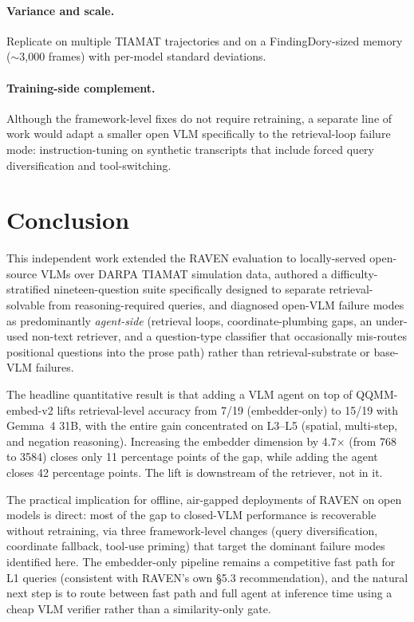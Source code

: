 \documentclass[12pt,letterpaper,oneside]{article}
\begin{document}
\paragraph{Variance and scale.}
Replicate on multiple TIAMAT trajectories and on a FindingDory-sized
memory ($\sim$3{,}000 frames) with per-model standard deviations.

\paragraph{Training-side complement.}
Although the framework-level fixes do not require retraining, a
separate line of work would adapt a smaller open VLM specifically to
the retrieval-loop failure mode: instruction-tuning on synthetic
transcripts that include forced query diversification and
tool-switching.

\section{Conclusion}\label{sec:conclusion}

This independent work extended the RAVEN evaluation to locally-served
open-source VLMs over DARPA TIAMAT simulation data, authored a
difficulty-stratified nineteen-question suite specifically designed
to separate retrieval-solvable from reasoning-required queries, and
diagnosed open-VLM failure modes as predominantly \emph{agent-side}
(retrieval loops, coordinate-plumbing gaps, an under-used non-text
retriever, and a question-type classifier that occasionally
mis-routes positional questions into the prose path) rather than
retrieval-substrate or base-VLM failures.

The headline quantitative result is that adding a VLM agent on top of
QQMM-embed-v2 lifts retrieval-level accuracy from 7/19 (embedder-only)
to 15/19 with Gemma~4 31B, with the entire gain concentrated on
L3--L5 (spatial, multi-step, and negation reasoning). Increasing
the embedder dimension by 4.7$\times$ (from 768 to 3584) closes
only 11 percentage points of the gap, while adding the agent closes
42 percentage points. The lift is downstream of the retriever, not
in it.

The practical implication for offline, air-gapped deployments of
RAVEN on open models is direct: most of the gap to closed-VLM
performance is recoverable without retraining, via three
framework-level changes (query diversification, coordinate fallback,
tool-use priming) that target the dominant failure modes identified
here.  The embedder-only pipeline remains a competitive fast path for
L1 queries (consistent with RAVEN's own \S5.3 recommendation), and
the natural next step is to route between fast path and full agent
at inference time using a cheap VLM verifier rather than a
similarity-only gate.
\end{document}

